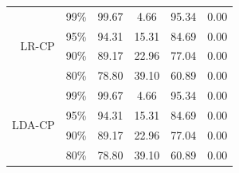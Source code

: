 \begin{table}[]
\begin{tabular}{@{}rccccc@{}}
\multirow{4}{*}{LR-CP}       & 99\% & 99.67  & 4.66 & 95.34 & 0.00  \\
                          & 95\% & 94.31  & 15.31 & 84.69 & 0.00 \\
                          & 90\% & 89.17  & 22.96 & 77.04 & 0.00 \\
                          & 80\% & 78.80 & 39.10 & 60.89 & 0.00 \\ \midrule
\multirow{4}{*}{LDA-CP}      & 99\% & 99.67  & 4.66 & 95.34 & 0.00  \\
                          & 95\% & 94.31  & 15.31 & 84.69 & 0.00 \\
                          & 90\% & 89.17  & 22.96 & 77.04 & 0.00 \\
                          & 80\% & 78.80 & 39.10 & 60.89 & 0.00 \\ \bottomrule
\end{tabular}
\end{table}

